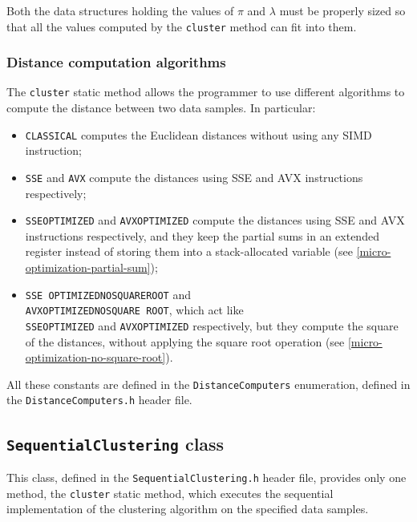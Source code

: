 \documentclass{article}
\begin{document}
Both the data structures holding the values of $\pi$ and $\lambda$ must be properly sized so that
all the values computed by the \texttt{cluster} method can fit into them.

\hypertarget{distance-computation-algorithms}{
\subsubsection{Distance computation algorithms}
\label{distance-computation-algorithms}}

The \texttt{cluster} static method allows the programmer to use different algorithms to compute
the distance between two data samples. In particular:
\begin{itemize}
\item \texttt{CLASSICAL} computes the Euclidean distances without using any SIMD
instruction;
\item \texttt{SSE} and \texttt{AVX} compute the distances using SSE and AVX
instructions respectively;
\item \texttt{SSE\textunderscore OPTIMIZED} and \texttt{AVX\textunderscore OPTIMIZED} compute the
distances using
SSE and AVX instructions respectively, and they keep the partial sums in an extended register
instead of storing them into a stack-allocated variable (see
\ref{micro-optimization-partial-sum});
\item \texttt{SSE\textunderscore
OPTIMIZED\textunderscore NO\textunderscore SQUARE\textunderscore ROOT} and\\
\texttt{AVX\textunderscore OPTIMIZED\textunderscore NO\textunderscore SQUARE\textunderscore
ROOT}, which act like\\ \texttt{SSE\textunderscore OPTIMIZED} and
\texttt{AVX\textunderscore OPTIMIZED} respectively, but they compute the square of the distances,
without applying the square root operation (see \ref{micro-optimization-no-square-root}).
\end{itemize}

All these constants are defined in the \texttt{DistanceComputers} enumeration, defined in the
\texttt{DistanceComputers.h} header file.

\hypertarget{sequential-clustering}{
\subsection{\texttt{SequentialClustering} class}
\label{sequential-clustering}}

This class, defined in the \texttt{SequentialClustering.h} header file, provides only one method,
the \texttt{cluster} static method, which executes the sequential implementation of the
clustering algorithm on the specified data samples.
\end{document}
